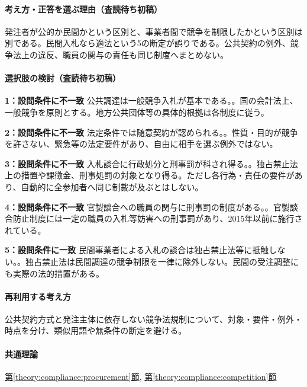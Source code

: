 \paragraph{考え方・正答を選ぶ理由（査読待ち初稿）} 発注者が公的か民間かという区別と、事業者間で競争を制限したかという区別は別である。民間入札なら適法という5の断定が誤りである。公共契約の例外、競争法上の違反、職員の関与の責任も同じ制度へまとめない。

\paragraph{選択肢の検討（査読待ち初稿）}\mbox{}\par

\noindent\textbf{1：設問条件に不一致} 公共調達は一般競争入札が基本である。。国の会計法上、一般競争を原則とする。地方公共団体等の具体的根拠は各制度に従う。\par

\noindent\textbf{2：設問条件に不一致} 法定条件では随意契約が認められる。。性質・目的が競争を許さない、緊急等の法定要件があり、自由に相手を選ぶ例外ではない。\par

\noindent\textbf{3：設問条件に不一致} 入札談合に行政処分と刑事罰が科され得る。。独占禁止法上の措置や課徴金、刑事処罰の対象となり得る。ただし各行為・責任の要件があり、自動的に全参加者へ同じ制裁が及ぶとはしない。\par

\noindent\textbf{4：設問条件に不一致} 官製談合への職員の関与に刑事罰の制度がある。。官製談合防止制度には一定の職員の入札等妨害への刑事罰があり、2015年以前に施行されている。\par

\noindent\textbf{5：設問条件に一致} 民間事業者による入札の談合は独占禁止法等に抵触しない。。独占禁止法は民間調達の競争制限を一律に除外しない。民間の受注調整にも実際の法的措置がある。\par

\paragraph{再利用する考え方} 公共契約方式と発注主体に依存しない競争法規制について、対象・要件・例外・時点を分け、類似用語や無条件の断定を避ける。

\paragraph{共通理論} \hyperref[theory:compliance:procurement]{第\ref*{theory:compliance:procurement}節}, \hyperref[theory:compliance:competition]{第\ref*{theory:compliance:competition}節}

